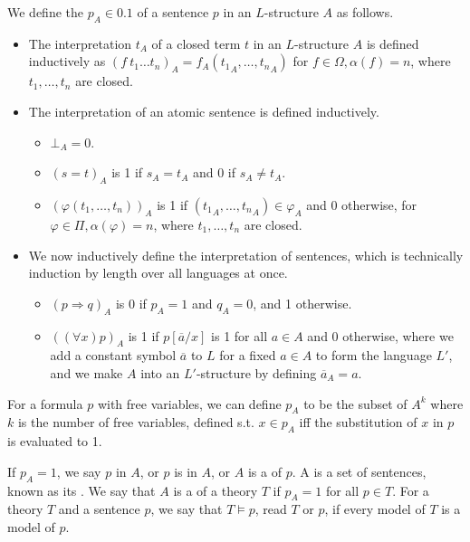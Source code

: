 We define the  $p_A \in \qty{0,1}$ of a sentence $p$ in an $L$-structure $A$ as follows.
\begin{itemize}
    \item The interpretation $t_A$ of a closed term $t$ in an $L$-structure $A$ is defined inductively as $(f\ t_1\dots t_n)_A = f_A({t_1}_A, \dots, {t_n}_A)$ for $f \in \Omega, \alpha(f) = n$, where $t_1, \dots, t_n$ are closed.
    \item The interpretation of an atomic sentence is defined inductively.
    \begin{itemize}
            \item $\bot_A = 0$.
        \item $(s = t)_A$ is 1 if $s_A = t_A$ and 0 if $s_A \neq t_A$.
        \item $(\varphi(t_1, \dots, t_n))_A$ is 1 if $({t_1}_A, \dots, {t_n}_A) \in \varphi_A$ and 0 otherwise, for $\varphi \in \Pi, \alpha(\varphi) = n$, where $t_1, \dots, t_n$ are closed.
    \end{itemize}
    \item We now inductively define the interpretation of sentences, which is technically induction by length over all languages at once.
    \begin{itemize}
        \item $(p \Rightarrow q)_A$ is 0 if $p_A = 1$ and $q_A = 0$, and 1 otherwise.
        \item $((\forall x)p)_A$ is 1 if $p[\overline a/x]$ is 1 for all $a \in A$ and 0 otherwise, where we add a constant symbol $\overline a$ to $L$ for a fixed $a \in A$ to form the language $L'$, and we make $A$ into an $L'$-structure by defining $\overline a_A = a$.
    \end{itemize}
\end{itemize}

\begin{remark}
    For a formula $p$ with free variables, we can define $p_A$ to be the subset of $A^k$ where $k$ is the number of free variables, defined s.t. $x \in p_A$ iff the substitution of $x$ in $p$ is evaluated to 1.

\end{remark}
\begin{definition}
    If $p_A = 1$, we say $p$  in $A$, or $p$ is  in $A$, or $A$ is a  of $p$.
    A  is a set of sentences, known as its .
    We say that $A$ is a  of a theory $T$ if $p_A = 1$ for all $p \in T$.
    For a theory $T$ and a sentence $p$, we say that $T \models p$, read $T$  or  $p$, if every model of $T$ is a model of $p$.
\end{definition}

